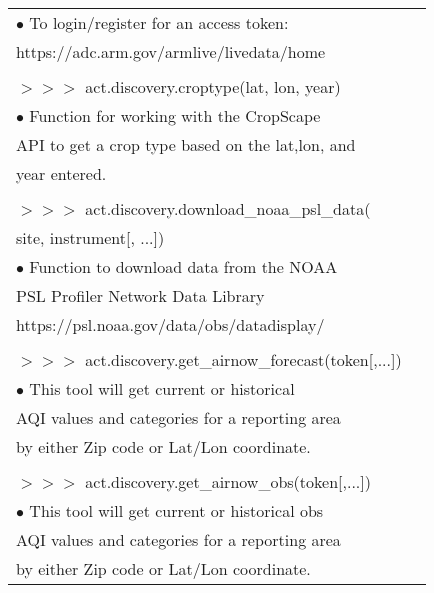 \documentclass[potrait, z1paper, fontscale=0.33]{baposter} %
\begin{document}
\begin{poster}
{\begin{flushleft}
\begin{tabular}{@{}ll@{}}
\-\hspace{0.2cm} $\bullet$ To login/register for an access token:\\
\-\hspace{0.5cm} https://adc.arm.gov/armlive/livedata/home\\
\\
$>$$>$$>$ act.discovery.croptype(lat, lon, year)\\
\-\hspace{0.2cm} $\bullet$ Function for working with the CropScape\\
\-\hspace{0.5cm} API to get a crop type based on the lat,lon, and\\
\-\hspace{0.5cm} year entered.\\
\\
$>$$>$$>$ act.discovery.download\_noaa\_psl\_data(\\
\-\hspace{1.5cm} site, instrument[, ...])\\
\-\hspace{0.2cm} $\bullet$ Function to download data from the NOAA\\
\-\hspace{0.5cm} PSL Profiler Network Data Library\\
\-\hspace{0.5cm} https://psl.noaa.gov/data/obs/datadisplay/\\
\\
$>$$>$$>$ act.discovery.get\_airnow\_forecast(token[,...])\\
\-\hspace{0.2cm} $\bullet$ This tool will get current or historical\\
\-\hspace{0.5cm} AQI values and categories for a reporting area\\
\-\hspace{0.5cm} by either Zip code or Lat/Lon coordinate.\\
\\
$>$$>$$>$ act.discovery.get\_airnow\_obs(token[,...])\\
\-\hspace{0.2cm} $\bullet$ This tool will get current or historical obs\\
\-\hspace{0.5cm} AQI values and categories for a reporting area\\
\-\hspace{0.5cm} by either Zip code or Lat/Lon coordinate.\\

\end{tabular}
\end{flushleft}}
\end{poster}
\end{document}

